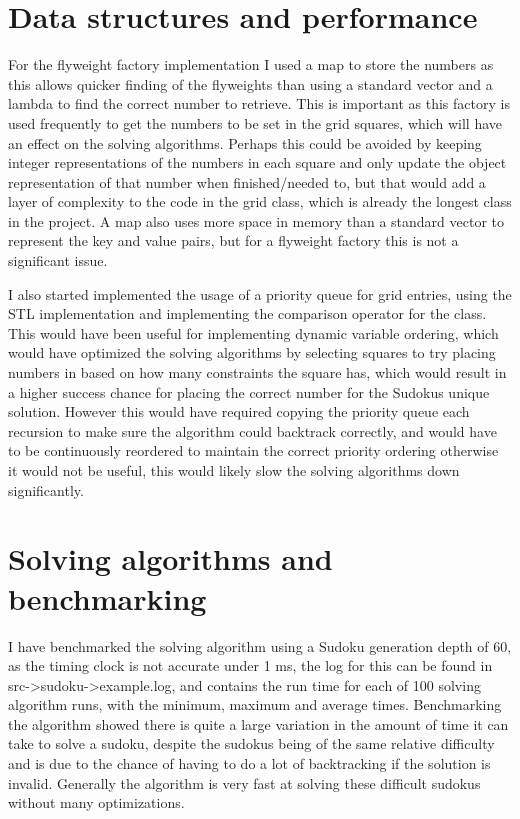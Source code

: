 \documentclass[]{final_report}
\begin{document}
\section*{Data structures and performance}

For the flyweight factory implementation I used a map to store the numbers as this allows quicker finding of the flyweights than using a standard vector and a lambda to find the correct number to retrieve. This is important as this factory is used frequently to get the numbers to be set in the grid squares, which will have an effect on the solving algorithms. Perhaps this could be avoided by keeping integer representations of the numbers in each square and only update the object representation of that number when finished/needed to, but that would add a layer of complexity to the code in the grid class, which is already the longest class in the project. A map also uses more space in memory than a standard vector to represent the key and value pairs, but for a flyweight factory this is not a significant issue.

I also started implemented the usage of a priority queue for grid entries, using the STL implementation and implementing the comparison operator for the class. This would have been useful for implementing dynamic variable ordering, which would have optimized the solving algorithms by selecting squares to try placing numbers in based on how many constraints the square has, which would result in a higher success chance for placing the correct number for the Sudokus unique solution. However this would have required copying the priority queue each recursion to make sure the algorithm could backtrack correctly, and would have to be continuously reordered to maintain the correct priority ordering otherwise it would not be useful, this would likely slow the solving algorithms down significantly.

\section*{Solving algorithms and benchmarking}

I have benchmarked the solving algorithm using a Sudoku generation depth of 60, as the timing clock is not accurate under 1 ms, the log for this can be found in src->sudoku->example.log, and contains the run time for each of 100 solving algorithm runs, with the minimum, maximum and average times. Benchmarking the algorithm showed there is quite a large variation in the amount of time it can take to solve a sudoku, despite the sudokus being of the same relative difficulty and is due to the chance of having to do a lot of backtracking if the solution is invalid. Generally the algorithm is very fast at solving these difficult sudokus without many optimizations.
\end{document}
